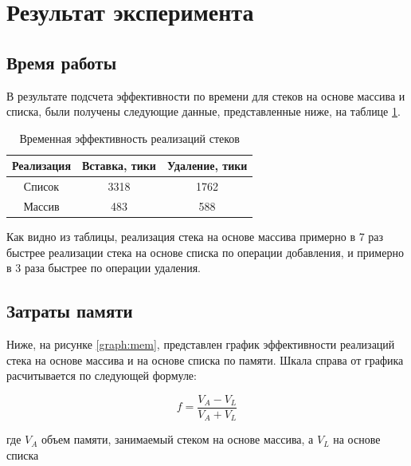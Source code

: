 \section{Результат эксперимента}


\subsection{Время работы}

В результате подсчета эффективности по времени для стеков на основе массива и списка, были получены следующие данные, представленные ниже, на таблице \ref{table:time}.

\begin{table}
	\caption{Временная эффективность реализаций стеков}
	\begin{center}
		\begin{tabular}{|c|c|c|}
			\hline
			Реализация & Вставка, тики & Удаление, тики \\
			\hline
			Список & 3318 & 1762  \\
			Массив & 483 & 588 \\
			\hline
		\end{tabular}
	\end{center}
	\label{table:time}
\end{table}

Как видно из таблицы, реализация стека на основе массива примерно в 7 раз быстрее реализации стека на основе списка по операции добавления, и примерно в 3 раза быстрее по операции удаления.

\subsection{Затраты памяти}

Ниже, на рисунке \ref{graph:mem}, представлен график эффективности реализаций стека на основе массива и на основе списка по памяти. Шкала справа от графика расчитывается по следующей формуле:

\begin{equation}
	f = \frac{V_A - V_L}{V_A + V_L}
\end{equation}

где $V_A$ объем памяти, занимаемый стеком на основе массива, а $V_L$ на основе списка

